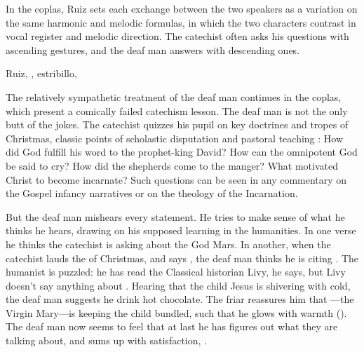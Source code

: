 In the coplas, Ruiz sets each exchange between the two speakers as a variation on the same harmonic and melodic formulas, in which the two characters contrast in vocal register and melodic direction.
The catechist often asks his questions with ascending gestures, and the deaf man answers with descending ones.

\begin{exmusic}
\caption{Ruiz, , estribillo, }
\label{exmusic:Ruiz-Sordos-dialogue}
\end{exmusic}

The relatively sympathetic treatment of the deaf man continues in the coplas, which present a comically failed catechism lesson.
The deaf man is not the only butt of the jokes.
The catechist quizzes his pupil on key doctrines and tropes of Christmas, classic points of scholastic disputation and pastoral teaching :
How did God fulfill his word to the prophet-king David?
How can the omnipotent God be said to cry?
How did the shepherds come to the manger?
What motivated Christ to become incarnate?
Such questions can be seen in any commentary on the Gospel infancy narratives or on the theology of the Incarnation.

But the deaf man mishears every statement.
He tries to make sense of what he thinks he hears, drawing on his supposed learning in the humanities.
In one verse he thinks the catechist is asking about the God Mars.
In another, when the catechist lauds the  of Christmas, and says , the deaf man thinks he is citing .
The humanist is puzzled: he has read the Classical historian Livy, he says, but Livy doesn't say anything about .
Hearing that the child Jesus is shivering with cold, the deaf man suggests he drink hot chocolate.
The friar reassures him that ---the Virgin Mary---is keeping the child  bundled, such that he glows with warmth ().
The deaf man now seems to feel that at last he has figures out what they are talking about, and sums up with satisfaction, .


